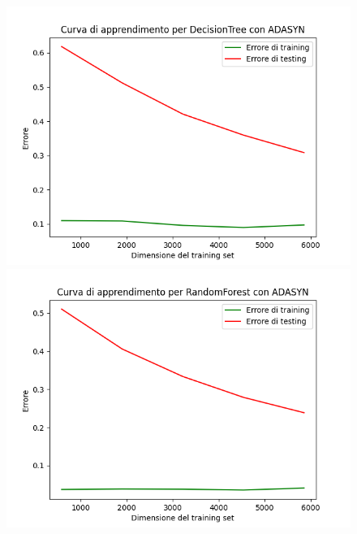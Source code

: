 \begin{figure}[H]
    \centering
    \begin{minipage}[b]{0.45\linewidth}
      \centering
      \includegraphics[scale=0.5]{img/learning_curve_DecisionTree_ADASYN.png}
      
    \end{minipage}
    \hfill
    \begin{minipage}[b]{0.45\linewidth}
      \centering
      \includegraphics[scale=0.5]{img/learning_curve_RandomForest_ADASYN.png}
      
    \end{minipage}
    

\end{figure}
